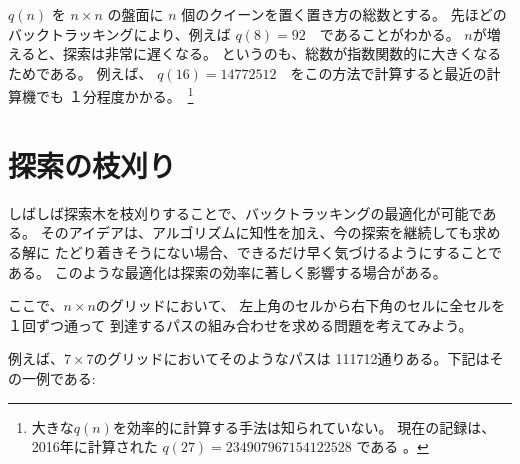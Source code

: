 $q(n)$ を $n \times n$ の盤面に $n$ 個のクイーンを置く置き方の総数とする。
先ほどのバックトラッキングにより、例えば $q(8)=92$　であることがわかる。
$n$が増えると、探索は非常に遅くなる。
というのも、総数が指数関数的に大きくなるためである。
例えば、 $q(16)=14772512$　をこの方法で計算すると最近の計算機でも
１分程度かかる。　\footnote{大きな$q(n)$を効率的に計算する手法は知られていない。
現在の記録は、2016年に計算された $q(27)=234907967154122528$ である \cite{q27}。}

\begin{comment}
\section{Pruning the search}

We can often optimize backtracking
by pruning the search tree.
The idea is to add ''intelligence'' to the algorithm
so that it will notice as soon as possible
if a partial solution cannot be extended
to a complete solution.
Such optimizations can have a tremendous
effect on the efficiency of the search.

Let us consider the problem
of calculating the number of paths
in an $n \times n$ grid from the upper-left corner
to the lower-right corner such that the
path visits each square exactly once.
For example, in a $7 \times 7$ grid,
there are 111712 such paths.
One of the paths is as follows:
\end{comment}

\section{探索の枝刈り}

しばしば探索木を枝刈りすることで、バックトラッキングの最適化が可能である。
そのアイデアは、アルゴリズムに知性を加え、今の探索を継続しても求める解に
たどり着きそうにない場合、できるだけ早く気づけるようにすることである。
このような最適化は探索の効率に著しく影響する場合がある。

ここで、$n \times n$のグリッドにおいて、
左上角のセルから右下角のセルに全セルを１回ずつ通って
到達するパスの組み合わせを求める問題を考えてみよう。

例えば、$7 \times 7$のグリッドにおいてそのようなパスは
111712通りある。下記はその一例である:

\begin{center}
\end{center}

